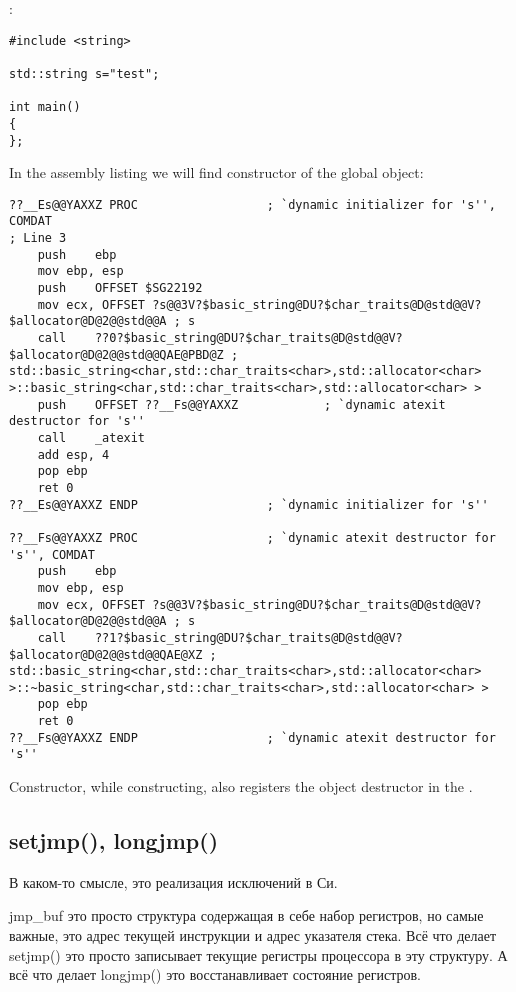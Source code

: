 :

\begin{lstlisting}
#include <string>

std::string s="test";

int main()
{
};
\end{lstlisting}

{In the assembly listing we will find constructor of the global object}:

\begin{lstlisting}[caption=MSVC 2010]
??__Es@@YAXXZ PROC					; `dynamic initializer for 's'', COMDAT
; Line 3
	push	ebp
	mov	ebp, esp
	push	OFFSET $SG22192
	mov	ecx, OFFSET ?s@@3V?$basic_string@DU?$char_traits@D@std@@V?$allocator@D@2@@std@@A ; s
	call	??0?$basic_string@DU?$char_traits@D@std@@V?$allocator@D@2@@std@@QAE@PBD@Z ; std::basic_string<char,std::char_traits<char>,std::allocator<char> >::basic_string<char,std::char_traits<char>,std::allocator<char> >
	push	OFFSET ??__Fs@@YAXXZ			; `dynamic atexit destructor for 's''
	call	_atexit
	add	esp, 4
	pop	ebp
	ret	0
??__Es@@YAXXZ ENDP					; `dynamic initializer for 's''

??__Fs@@YAXXZ PROC					; `dynamic atexit destructor for 's'', COMDAT
	push	ebp
	mov	ebp, esp
	mov	ecx, OFFSET ?s@@3V?$basic_string@DU?$char_traits@D@std@@V?$allocator@D@2@@std@@A ; s
	call	??1?$basic_string@DU?$char_traits@D@std@@V?$allocator@D@2@@std@@QAE@XZ ; std::basic_string<char,std::char_traits<char>,std::allocator<char> >::~basic_string<char,std::char_traits<char>,std::allocator<char> >
	pop	ebp
	ret	0
??__Fs@@YAXXZ ENDP					; `dynamic atexit destructor for 's''
\end{lstlisting}

{Constructor, while constructing, also registers the object destructor in the} .



\subsection{setjmp(), longjmp()}

В каком-то смысле, это реализация исключений в Си.

jmp\_buf это просто структура содержащая в себе набор регистров, но самые важные, это адрес текущей инструкции
и адрес указателя стека.
Всё что делает setjmp() это просто записывает текущие регистры процессора в эту структуру.
А всё что делает longjmp() это восстанавливает состояние регистров.

